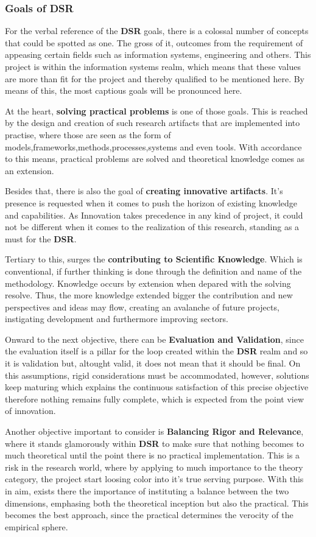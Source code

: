 \subsubsection{Goals of DSR}
For the verbal reference of the \textbf{DSR} goals, there is a colossal number of concepts that could be spotted as 
one. The gross of it, outcomes from the requirement of appeasing certain fields such as information systems,
engineering and others. This project is within the information systems realm, which means that these values are more than fit 
for the project and thereby qualified to be mentioned here. By means of this, the most captious goals will be pronounced here.

At the heart, \textbf{solving practical problems} is one of those goals. This is reached by the design and creation of such 
research artifacts that are implemented into practise, where those are seen as the form of models,frameworks,methods,processes,systems 
and even tools. With accordance to this means, practical problems are solved and theoretical knowledge comes as an extension.

Besides that, there is also the goal of \textbf{creating innovative artifacts}. It's presence is requested when it comes to push the
horizon of existing knowledge and capabilities. As Innovation takes precedence in any kind of project, it could not be different when 
it comes to the realization of this research, standing as a must for the \textbf{DSR}.

Tertiary to this, surges the \textbf{contributing to Scientific Knowledge}. Which is conventional, if further thinking is done through 
the definition and name of the methodology. Knowledge occurs by extension when depared with the solving resolve. Thus, the more knowledge
extended bigger the contribution and new perspectives and ideas may flow, creating an avalanche of future projects, instigating development
and furthermore improving sectors.

Onward to the next objective, there can be \textbf{Evaluation and Validation}, since the evaluation itself is a pillar for the loop
created within the \textbf{DSR} realm and so it is validation but, altought valid, it does not mean that it should be final. On this 
assumptions, rigid considerations must be accommodated, however, solutions keep maturing which explains the continuous satisfaction 
of this precise objective therefore nothing remains fully complete, which is expected from the point view of innovation.

Another objective important to consider is \textbf{Balancing Rigor and Relevance}, where it stands glamorously within \textbf{DSR} to 
make sure that nothing becomes to much theoretical until the point there is no practical implementation. This is a risk in the 
research world, where by applying to much importance to the theory category, the project start loosing color into it's true serving 
purpose. With this in aim, exists there the importance of instituting a balance between the two dimensions, emphasing both the theoretical 
inception but also the practical. This becomes the best approach, since the practical determines the verocity of the empirical sphere.

